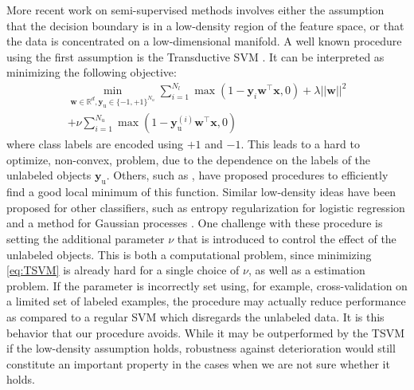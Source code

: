 \documentclass{article}
\renewcommand{\vec}[1]{\mathbf{#1}}
\begin{document}
More recent work on semi-supervised methods involves either the assumption that the decision boundary is in a low-density region of the feature space, or that the data is concentrated on a low-dimensional manifold. A well known procedure using the first assumption is the Transductive SVM \citep{Joachims1999}. It can be interpreted as minimizing the following objective:
\begin{multline}
\label{eq:TSVM}
\min_{\vec{w} \in \mathbb{R}^d,\vec{y}_\text{u} \in \{-1,+1\}^{N_u}} \sum_{i=1}^{N_l} \max(1-\vec{y}_i \vec{w}^\top \vec{x},0) + \lambda ||\vec{w}||^2 \\ + \nu \sum_{i=1}^{N_u} \max(1-\vec{y}_\text{u}^{(i)} \vec{w}^\top \vec{x},0)
\end{multline}
where class labels are encoded using $+1$ and $-1$. This leads to a hard to optimize, non-convex, problem, due to the dependence on the labels of the unlabeled objects $\vec{y}_\text{u}$. Others, such as \citep{Sindhwani2006}, have proposed procedures to efficiently find a good local minimum of this function. Similar low-density ideas have been proposed for other classifiers, such as entropy regularization for logistic regression \citep{Grandvalet2005} and a method for Gaussian processes \citep{Lawrence2004}. One challenge with these procedure is setting the additional parameter $\nu$ that is introduced to control the effect of the unlabeled objects. This is both a computational problem, since minimizing \eqref{eq:TSVM} is already hard for a single choice of $\nu$, as well as a estimation problem. If the parameter is incorrectly set using, for example, cross-validation on a limited set of labeled examples, the procedure may actually reduce performance as compared to a regular SVM which disregards the unlabeled data. It is this behavior that our procedure avoids. While it may be outperformed by the TSVM if the low-density assumption holds, robustness against deterioration would still constitute an important property in the cases when we are not sure whether it holds.

\end{document}
